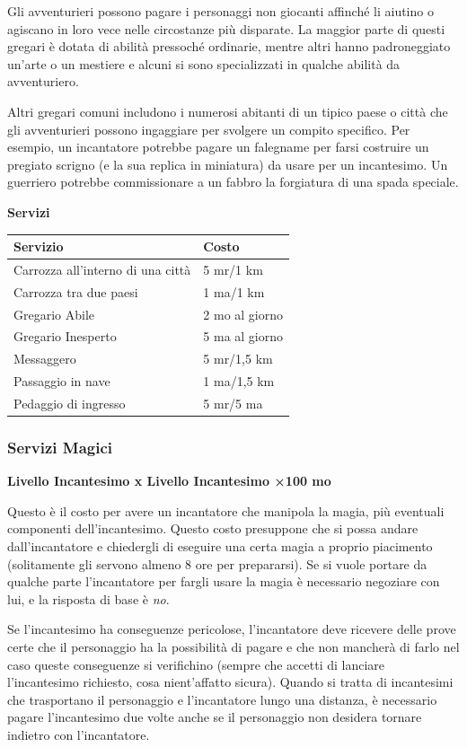 \begin{multicols}{2}
\medskip

Gli avventurieri possono pagare i personaggi non giocanti affinché li aiutino o agiscano in loro vece nelle circostanze più disparate. La maggior parte di questi gregari è dotata di abilità pressoché ordinarie, mentre altri hanno padroneggiato un'arte o un mestiere e alcuni si sono specializzati in qualche abilità da avventuriero.

Altri gregari comuni includono i numerosi abitanti di un tipico paese o città che gli avventurieri possono ingaggiare per svolgere un compito specifico. Per esempio, un incantatore potrebbe pagare un falegname per farsi costruire un pregiato scrigno (e la sua replica in miniatura) da usare per un incantesimo.
Un guerriero potrebbe commissionare a un fabbro la forgiatura di una spada speciale.

\medskip

\textbf{Servizi}

\bigskip

\noindent\begin{tabularx}{0.48\textwidth}{ll}
\textbf{Servizio}&\textbf{Costo}\\
\toprule
Carrozza all'interno di una città&5 mr/1 km\\
Carrozza tra due paesi&1 ma/1 km\\
Gregario Abile&2 mo al giorno\\
Gregario Inesperto&5 ma al giorno\\
Messaggero&5 mr/1,5 km\\
Passaggio in nave&1 ma/1,5 km\\
Pedaggio di ingresso&5 mr/5 ma
\end{tabularx}

\subsubsection{Servizi Magici}

\textbf{Livello Incantesimo x Livello Incantesimo ×100 mo}

Questo è il costo per avere un incantatore che manipola la magia, più eventuali componenti dell'incantesimo. Questo costo presuppone che si possa andare dall'incantatore e chiedergli di eseguire una certa magia a proprio piacimento (solitamente gli servono almeno 8 ore per prepararsi). Se si vuole portare da qualche parte l'incantatore per fargli usare la magia è necessario negoziare con lui, e la risposta di base è \emph{no}.

Se l'incantesimo ha conseguenze pericolose, l'incantatore deve ricevere delle prove certe che il personaggio ha la possibilità di pagare e che non mancherà di farlo nel caso queste conseguenze si verifichino (sempre che accetti di lanciare l'incantesimo richiesto, cosa nient'affatto sicura). Quando si tratta di incantesimi che trasportano il personaggio e l'incantatore lungo una distanza, è necessario pagare l'incantesimo due volte anche se il personaggio non desidera tornare indietro con l'incantatore.


\end{multicols}
